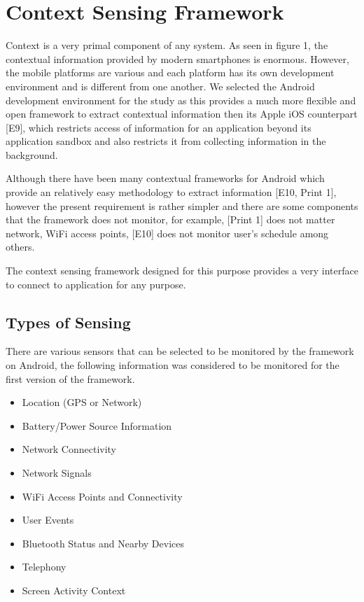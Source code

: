 \documentclass[12pt]{report}
\begin{document}
\chapter{Context Sensing Framework}
\label{ContextSensingFramework}
Context is a very primal component of any system. As seen in figure 1, the contextual information provided by modern smartphones is enormous. However, the mobile platforms are various and each platform has its own development environment and is different from one another. We selected the Android development environment for the study as this provides a much more flexible and open framework to extract contextual information then its Apple iOS counterpart [E9], which restricts access of information for an application beyond its application sandbox and also restricts it from collecting information in the background.

Although there have been many contextual frameworks for Android which provide an relatively easy methodology to extract information [E10, Print 1], however the present requirement is rather simpler and there are some components that the framework does not monitor, for example, [Print 1] does not matter network, WiFi access points, [E10] does not monitor user's schedule among others.

The context sensing framework designed for this purpose provides a very interface to connect to application for any purpose.

\section{Types of Sensing}
\label{contextType}
There are various sensors that can be selected to be monitored by the framework on Android, the following information was considered to be monitored for the first version of the framework.

\begin{itemize}
\item Location (GPS or Network)
\item Battery/Power Source Information
\item Network Connectivity
\item Network Signals
\item WiFi Access Points and Connectivity
\item User Events
\item Bluetooth Status and Nearby Devices
\item Telephony
\item Screen Activity Context
\end{itemize}
\end{document}
